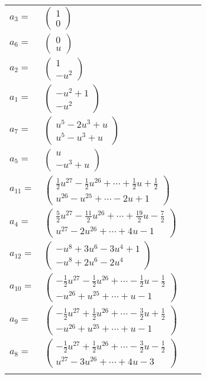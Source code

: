 \documentclass[1p]{elsarticle_modified}
\theoremstyle{definition}
\begin{document}
\begin{tabular}{m{7pt} m{180pt} m{7pt} m{180pt} }
\flushright $a_{3}=$&$\begin{pmatrix}1\\0\end{pmatrix}$ \\
\flushright $a_{6}=$&$\begin{pmatrix}0\\u\end{pmatrix}$ \\
\flushright $a_{2}=$&$\begin{pmatrix}1\\- u^2\end{pmatrix}$ \\
\flushright $a_{1}=$&$\begin{pmatrix}- u^2+1\\- u^2\end{pmatrix}$ \\
\flushright $a_{7}=$&$\begin{pmatrix}u^5-2 u^3+u\\u^5- u^3+u\end{pmatrix}$ \\
\flushright $a_{5}=$&$\begin{pmatrix}u\\- u^3+u\end{pmatrix}$ \\
\flushright $a_{11}=$&$\begin{pmatrix}\frac{1}{2} u^{27}-\frac{1}{2} u^{26}+\cdots+\frac{1}{2} u+\frac{1}{2}\\u^{26}- u^{25}+\cdots-2 u+1\end{pmatrix}$ \\
\flushright $a_{4}=$&$\begin{pmatrix}\frac{5}{2} u^{27}-\frac{11}{2} u^{26}+\cdots+\frac{19}{2} u-\frac{7}{2}\\u^{27}-2 u^{26}+\cdots+4 u-1\end{pmatrix}$ \\
\flushright $a_{12}=$&$\begin{pmatrix}- u^8+3 u^6-3 u^4+1\\- u^8+2 u^6-2 u^4\end{pmatrix}$ \\
\flushright $a_{10}=$&$\begin{pmatrix}-\frac{1}{2} u^{27}-\frac{1}{2} u^{26}+\cdots-\frac{1}{2} u-\frac{1}{2}\\- u^{26}+u^{25}+\cdots+u-1\end{pmatrix}$ \\
\flushright $a_{9}=$&$\begin{pmatrix}-\frac{1}{2} u^{27}+\frac{1}{2} u^{26}+\cdots-\frac{3}{2} u+\frac{1}{2}\\- u^{26}+u^{25}+\cdots+u-1\end{pmatrix}$ \\
\flushright $a_{8}=$&$\begin{pmatrix}-\frac{1}{2} u^{27}+\frac{1}{2} u^{26}+\cdots-\frac{3}{2} u-\frac{1}{2}\\u^{27}-3 u^{26}+\cdots+4 u-3\end{pmatrix}$\\&\end{tabular}
\end{document}
